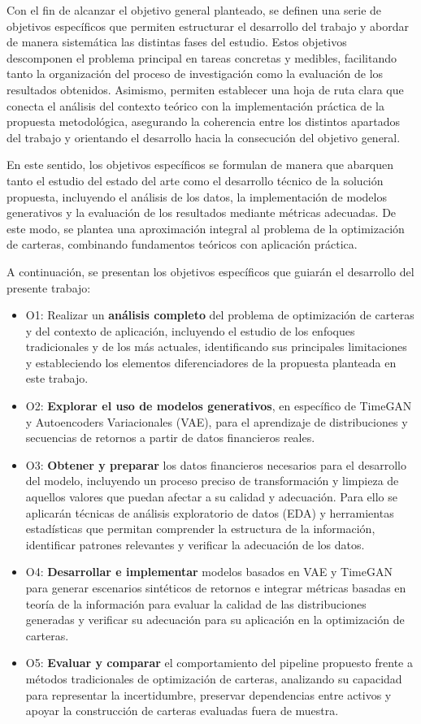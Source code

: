 \documentclass[11pt,a4paper,spanish,oneside]{book}
\numberwithin{equation}{chapter}
\numberwithin{figure}{chapter}
\begin{document}
Con el fin de alcanzar el objetivo general planteado, se definen una serie de objetivos específicos que permiten estructurar el desarrollo del trabajo y abordar de manera sistemática las distintas fases del estudio. Estos objetivos descomponen el problema principal en tareas concretas y medibles, facilitando tanto la organización del proceso de investigación como la evaluación de los resultados obtenidos. Asimismo, permiten establecer una hoja de ruta clara que conecta el análisis del contexto teórico con la implementación práctica de la propuesta metodológica, asegurando la coherencia entre los distintos apartados del trabajo y orientando el desarrollo hacia la consecución del objetivo general.

En este sentido, los objetivos específicos se formulan de manera que abarquen tanto el estudio del estado del arte como el desarrollo técnico de la solución propuesta, incluyendo el análisis de los datos, la implementación de modelos generativos y la evaluación de los resultados mediante métricas adecuadas. De este modo, se plantea una aproximación integral al problema de la optimización de carteras, combinando fundamentos teóricos con aplicación práctica.

A continuación, se presentan los objetivos específicos que guiarán el desarrollo del presente trabajo:

\begin{itemize}
\item O1: Realizar un {\bf análisis completo} del problema de optimización de carteras y del contexto de aplicación, incluyendo el estudio de los enfoques tradicionales y de los más actuales, identificando sus principales limitaciones y estableciendo los elementos diferenciadores de la propuesta planteada en este trabajo.
\item O2: {\bf Explorar el uso de modelos generativos}, en específico de TimeGAN y Autoencoders Variacionales (VAE), para el aprendizaje de distribuciones y secuencias de retornos a partir de datos financieros reales.
\item O3: {\bf Obtener y preparar} los datos financieros necesarios para el desarrollo del modelo, incluyendo un proceso preciso de transformación y limpieza de aquellos valores que puedan afectar a su calidad y adecuación. Para ello se aplicarán técnicas de análisis exploratorio de datos (EDA) y herramientas estadísticas que permitan comprender la estructura de la información, identificar patrones relevantes y verificar la adecuación de los datos.
\item O4: {\bf Desarrollar e implementar} modelos basados en VAE y TimeGAN para generar escenarios sintéticos de retornos e integrar métricas basadas en teoría de la información para evaluar la calidad de las distribuciones generadas y verificar su adecuación para su aplicación en la optimización de carteras.
\item O5: {\bf Evaluar y comparar} el comportamiento del pipeline propuesto frente a métodos tradicionales de optimización de carteras, analizando su capacidad para representar la incertidumbre, preservar dependencias entre activos y apoyar la construcción de carteras evaluadas fuera de muestra.
\end{itemize}
\end{document}
